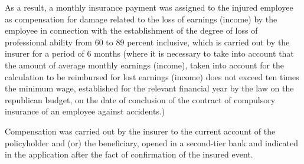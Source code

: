 \begin{multicols}{2}
As a result, a monthly insurance payment was assigned to the injured
employee as compensation for damage related to the loss of earnings
(income) by the employee in connection with the establishment of the
degree of loss of professional ability from 60 to 89 percent inclusive,
which is carried out by the insurer for a period of 6 months (where it
is necessary to take into account that the amount of average monthly
earnings (income), taken into account for the calculation to be
reimbursed for lost earnings (income) does not exceed ten times the
minimum wage, established for the relevant financial year by the law on
the republican budget, on the date of conclusion of the contract of
compulsory insurance of an employee against accidents.)

Compensation was carried out by the insurer to the current account of
the policyholder and (or) the beneficiary, opened in a second-tier bank
and indicated in the application after the fact of confirmation of the
insured event.
\end{multicols}

